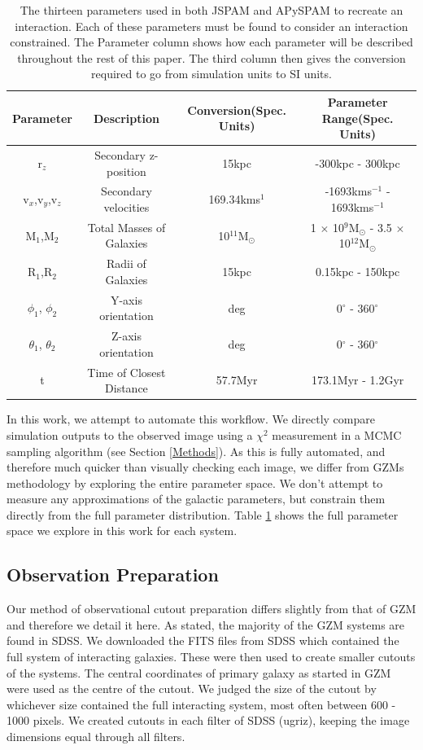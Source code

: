 \begin{table}
    \centering
    \begin{tabular}{|c|c|c|c|}
        \hline
        Parameter & Description & Conversion(Spec. Units) & Parameter Range(Spec. Units)  \\
        \hline
        r$_{z}$ & Secondary z-position & 15kpc & -300kpc - 300kpc \\
        v$_{x}$,v$_{y}$,v$_{z}$ & Secondary velocities & 169.34kms$^{1}$ & -1693kms$^{-1}$ - 1693kms$^{-1}$ \\
        M$_{1}$,M$_{2}$ & Total Masses of Galaxies & 10$^{11}$M$_{\odot}$ & 1 $\times$ 10$^{9}$M$_{\odot}$ - 3.5 $\times$ 10$^{12}$M$_{\odot}$ \\
        R$_{1}$,R$_{2}$ & Radii of Galaxies & 15kpc & 0.15kpc - 150kpc\\
        $\phi_{1}$, $\phi_{2}$ & Y-axis orientation & deg & 0$^{\circ}$ - 360$^{\circ}$ \\
        $\theta_{1}$, $\theta_{2}$ & Z-axis orientation & deg & 0$^{\circ}$ - 360$^{\circ}$ \\
        t & Time of Closest Distance & 57.7Myr & 173.1Myr - 1.2Gyr \\
        \hline
    \end{tabular}
    \caption{The thirteen parameters used in both JSPAM and APySPAM to recreate an interaction. Each of these parameters must be found to consider an interaction constrained. The Parameter column shows how each parameter will be described throughout the rest of this paper. The third column then gives the conversion required to go from simulation units to SI units.  }
    \label{tab:parameters}
\end{table}

In this work, we attempt to automate this workflow. We directly compare simulation outputs to the observed image using a $\chi^{2}$ measurement in a MCMC sampling algorithm (see Section \ref{Methods}). As this is fully automated, and therefore much quicker than visually checking each image, we differ from GZMs methodology by exploring the entire parameter space. We don't attempt to measure any approximations of the galactic parameters, but constrain them directly from the full parameter distribution. Table \ref{tab:parameters} shows the full parameter space we explore in this work for each system.

\subsection{Observation Preparation}
\noindent Our method of observational cutout preparation differs slightly from that of GZM and therefore we detail it here. As stated, the majority of the GZM systems are found in SDSS. We downloaded the FITS files from SDSS which contained the full system of interacting galaxies. These were then used to create smaller cutouts of the systems. The central coordinates of primary galaxy as started in GZM were used as the centre of the cutout. We judged the size of the cutout by whichever size contained the full interacting system, most often between 600 - 1000 pixels. We created cutouts in each filter of SDSS (ugriz), keeping the image dimensions equal through all filters. 

